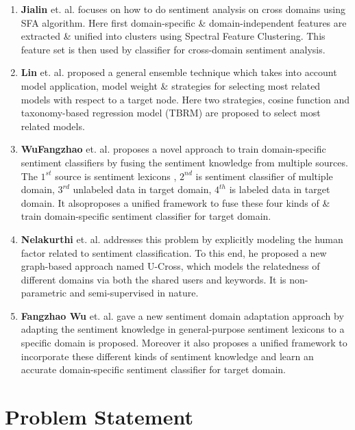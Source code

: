 \documentclass{report}
\begin{document}
\begin{enumerate}[label=\alph*).]
\item \textbf{Jialin} et. al.\cite{Pan:2010:CSC:1772690.1772767} focuses on how to do sentiment analysis on cross domains using SFA algorithm. Here first domain-specific \& domain-independent features are extracted \& unified into clusters using Spectral Feature Clustering. This feature set is then used by classifier for cross-domain sentiment analysis.
\item \textbf{Lin} et. al.\cite{Lin:2014:EEM:2661829.2662071} proposed a general ensemble technique which takes into account model application, model weight \& strategies for selecting most related models with respect to a target node. Here two strategies, cosine function and taxonomy-based regression model (TBRM) are proposed to select most related models.
\item \textbf{WuFangzhao} et. al.\cite{WU201726} proposes a novel approach to train domain-specific sentiment classifiers by fusing the sentiment knowledge from multiple sources. The \(1^{st}\) source is sentiment lexicons , \(2^{nd}\) is sentiment classifier of multiple domain, \(3^{rd}\) unlabeled data in target domain, \(4^{th}\) is labeled data in target domain. It alsoproposes a unified framework to fuse these four kinds of \& train domain-specific sentiment classifier for target domain.
\item \textbf{Nelakurthi} et. al.\cite{doi:10.1137/1.9781611974973.53} addresses this problem by explicitly modeling the human factor related to sentiment classification. To this end, he proposed a new graph-based approach named U-Cross, which models the relatedness of different domains via both the shared users and keywords. It is non-parametric and semi-supervised in nature.
\item \textbf{Fangzhao Wu} et. al.\cite{Wu:2016:SDA:2983323.2983851} gave a new sentiment domain adaptation approach by adapting the sentiment knowledge in general-purpose sentiment lexicons to a specific domain is proposed. Moreover it also proposes a unified framework to incorporate these different kinds of sentiment knowledge and learn an accurate domain-specific sentiment classifier for target domain.
\end{enumerate}



\chapter{Problem Statement}
\end{document}
